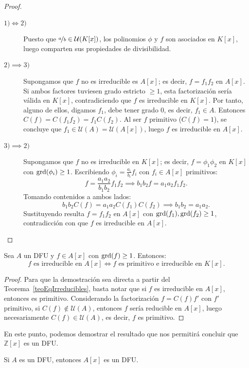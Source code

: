 \begin{proof}\leavevmode
\begin{description}
    \item[$1) \iff 2)$] Puesto que $\nicefrac{a}{b} \in \mathcal{U}(K[x])$, los polinomios $\phi$ y $f$ son asociados en $K[x]$, luego comparten sus propiedades de divisibilidad.

    \item[$2) \implies 3)$] Supongamos que $f$ no es irreducible es $A[x]$; es decir, $f = f_1 f_2$ en $A[x]$. Si ambos factores tuviesen grado estricto $\geq 1$, esta factorización sería válida en $K[x]$, contradiciendo que $f$ es irreducible en $K[x]$. Por tanto, alguno de ellos, digamos $f_1$, debe tener grado $0$, es decir, $f_1 \in A$. Entonces $C(f) = C(f_1 f_2) = f_1 C(f_2)$. Al ser $f$ primitivo ($C(f) = 1$), se concluye que $f_1 \in \mathcal{U}(A) = \mathcal{U}(A[x])$, luego $f$ es irreducible en $A[x]$.

    \item[$3) \implies 2)$] Supongamos que $f$ no es irreducible en $K[x]$; es decir, $f = \phi_1 \phi_2$ en $K[x]$ con $\operatorname{grd}(\phi_i) \geq 1$. Escribiendo $\phi_i = \frac{a_i}{b_i} f_i$ con $f_i \in A[x]$ primitivos:
    \[
        f = \frac{a_1 a_2}{b_1 b_2} f_1 f_2 \implies b_1 b_2 f = a_1 a_2 f_1 f_2.
    \]
    Tomando contenidos a ambos lados:
    \[
        b_1 b_2 C(f) = a_1 a_2 C(f_1) C(f_2) \implies b_1 b_2 = a_1 a_2.
    \]
    Sustituyendo resulta $f = f_1 f_2$ en $A[x]$ con $\operatorname{grd}(f_1), \operatorname{grd}(f_2) \geq 1$, contradicción con que $f$ es irreducible en $A[x]$.
\end{description}
\end{proof}

\begin{coro}
    Sea $A$ un DFU y $f \in A[x]$ con $\operatorname{grd}(f) \geq 1$. Entonces:
    \[
        f \text{ es irreducible en } A[x] \iff f \text{ es primitivo e irreducible en } K[x].
    \]
\end{coro}
\begin{proof}
    Para que la demostración sea directa a partir del Teorema~\ref{teoEqIrreducibles}, basta notar que si $f$ es irreducible en $A[x]$, entonces es primitivo. Considerando la factorización $f = C(f) f'$ con $f'$ primitivo, si $C(f) \notin \mathcal{U}(A)$, entonces $f$ sería reducible en $A[x]$, luego necesariamente $C(f) \in \mathcal{U}(A)$, es decir, $f$ es primitivo.
\end{proof}

En este punto, podemos demostrar el resultado que nos permitirá concluir que $\mathbb{Z}[x]$ es un DFU.
\begin{teo}[de Gauss]\label{teoGauss}
    Si $A$ es un DFU, entonces $A[x]$ es un DFU.
\end{teo}

